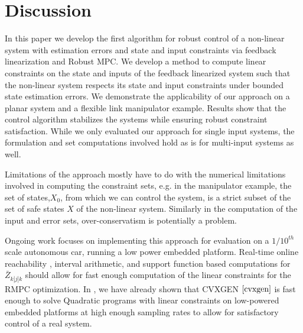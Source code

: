 \section{Discussion}
\label{sec:discussion}
In this paper we develop the first algorithm for robust control of a non-linear system with estimation errors and state and input constraints via feedback linearization and Robust MPC. 
We develop a method to compute linear constraints on the state and inputs of the feedback linearized system such that the non-linear system respects its state and input constraints under bounded state estimation errors. 
We demonstrate the applicability of our approach on a planar system and a flexible link manipulator example. Results show that the control algorithm stabilizes the systems while ensuring robust constraint satisfaction.%
While we only evaluated our approach for single input systems, the formulation and set computations involved hold as is for multi-input systems as well.

Limitations of the approach mostly have to do with the numerical limitations involved in computing the constraint sets, e.g. in the manipulator example, the set of states,$X_0$, from which we can control the system, is a strict subset of the set of safe states $X$ of the non-linear system. 
Similarly in the computation of the input and error sets, over-conservatism is potentially a problem.

Ongoing work focuses on implementing this approach for evaluation on a $1/10^{th}$ scale autonomous car, running a low power embedded platform. Real-time online reachability \cite{rtreach}, interval arithmetic,
and support function based computations for $\bar{Z}_{k|j|k}$ should allow for fast enough computation of the linear constraints for the RMPC optimization. In \cite{PantAMNDM15_Anytime}, we have already shown that CVXGEN $\cite{cvxgen}$ is fast enough to solve Quadratic programs with linear constraints on low-powered embedded platforms at high enough sampling rates to allow for satisfactory control of a real system.



